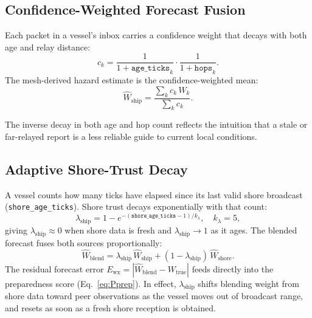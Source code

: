 \documentclass[cameraready]{Interspeech}
\begin{document}
\subsection{Confidence-Weighted Forecast Fusion}

Each packet in a vessel's inbox carries a confidence weight that decays with both age and relay distance:
%
\begin{equation}
  c_k = \frac{1}{1 + \texttt{age\_ticks}_k}
        \cdot
        \frac{1}{1 + \texttt{hops}_k}.
  \label{eq:confidence}
\end{equation}
%
The mesh-derived hazard estimate is the confidence-weighted mean:
%
\begin{equation}
  \hat{W}_\text{ship} =
    \frac{\displaystyle\sum_k c_k\, W_k}{\displaystyle\sum_k c_k}.
  \label{eq:meshblend}
\end{equation}

The inverse decay in both age and hop count reflects the intuition that a stale or far-relayed report is a less reliable guide to current local conditions.

\subsection{Adaptive Shore-Trust Decay}

A vessel counts how many ticks have elapsed since its last valid shore broadcast (\texttt{shore\_age\_ticks}). Shore trust decays exponentially with that count:
%
\begin{equation}
  \lambda_\text{ship} = 1 - e^{-(\texttt{shore\_age\_ticks}-1)/k_\lambda},
  \quad k_\lambda = 5,
  \label{eq:lambda}
\end{equation}
%
giving $\lambda_\text{ship} \approx 0$ when shore data is fresh and $\lambda_\text{ship} \to 1$ as it ages. The blended forecast fuses both sources proportionally:
%
\begin{equation}
  \hat{W}_\text{blend} =
    \lambda_\text{ship}\,\hat{W}_\text{ship}
    + (1 - \lambda_\text{ship})\,\hat{W}_\text{shore}.
  \label{eq:blend}
\end{equation}
%
The residual forecast error $E_\text{wx} = |\hat{W}_\text{blend} - W_\text{true}|$ feeds directly into the preparedness score (Eq.~\ref{eq:Pprep}). In effect, $\lambda_\text{ship}$ shifts blending weight from shore data toward peer observations as the vessel moves out of broadcast range, and resets as soon as a fresh shore reception is obtained.

\end{document}
